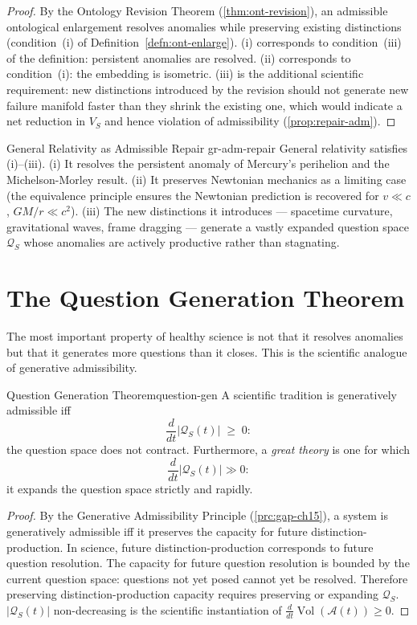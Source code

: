 \documentclass[12pt,twoside,openright]{book}
\newcommand{\adm}{\mathcal{A}}
\newcommand{\Vol}{\operatorname{Vol}}
\begin{document}
\begin{proof}
  By the Ontology Revision Theorem
  (\cref{thm:ont-revision}), an admissible ontological
  enlargement resolves anomalies while preserving
  existing distinctions (condition~(i) of
  Definition~\ref{defn:ont-enlarge}).
  (i) corresponds to condition~(iii) of the definition:
  persistent anomalies are resolved.
  (ii) corresponds to condition~(i): the embedding is
  isometric.
  (iii) is the additional scientific requirement:
  new distinctions introduced by the revision should
  not generate new failure manifold faster than they
  shrink the existing one, which would indicate a
  net reduction in $V_S$ and hence violation of
  admissibility (\cref{prop:repair-adm}).
\end{proof}

\begin{example}{General Relativity as Admissible Repair}%
  {gr-adm-repair}
  General relativity satisfies (i)--(iii).
  (i) It resolves the persistent anomaly of Mercury's
  perihelion and the Michelson-Morley result.
  (ii) It preserves Newtonian mechanics as a limiting
  case (the equivalence principle ensures the
  Newtonian prediction is recovered for
  $v \ll c$, $GM/r \ll c^2$).
  (iii) The new distinctions it introduces — spacetime
  curvature, gravitational waves, frame dragging —
  generate a vastly expanded question space $\mathcal{Q}_S$
  whose anomalies are actively productive rather than
  stagnating.
\end{example}

\section{The Question Generation Theorem}

The most important property of healthy science is not
that it resolves anomalies but that it generates more
questions than it closes. This is the scientific
analogue of generative admissibility.

\begin{theorem}{Question Generation Theorem}{question-gen}
  A scientific tradition is generatively admissible iff
  \[
    \frac{d}{dt}|\mathcal{Q}_S(t)| \;\ge\; 0:
  \]
  the question space does not contract.
  Furthermore, a \emph{great theory} is one for which
  \[
    \frac{d}{dt}|\mathcal{Q}_S(t)| \gg 0:
  \]
  it expands the question space strictly and rapidly.
\end{theorem}

\begin{proof}
  By the Generative Admissibility Principle
  (\cref{prc:gap-ch15}), a system is generatively
  admissible iff it preserves the capacity for future
  distinction-production.
  In science, future distinction-production corresponds
  to future question resolution.
  The capacity for future question resolution is bounded
  by the current question space: questions not yet
  posed cannot yet be resolved.
  Therefore preserving distinction-production capacity
  requires preserving or expanding $\mathcal{Q}_S$.
  $|\mathcal{Q}_S(t)|$ non-decreasing is the
  scientific instantiation of
  $\frac{d}{dt}\Vol(\adm(t)) \ge 0$.
\end{proof}
\end{document}
